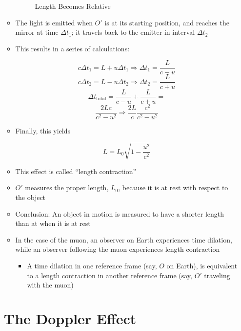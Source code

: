 \begin{itemize}
\begin{itemize}
          \begin{figure}[h]
            \centering
            
            \caption{Length Becomes Relative}
            \label{fig:3}
          \end{figure}

        \item The light is emitted when  $O'$ is at its starting position, and reaches the mirror at time $\Delta t_1$; it travels back to the emitter in interval $\Delta t_2$

        \item This results in a series of calculations:

          $$c\Delta t_1 = L + u\Delta t_1\Rightarrow \Delta t_1 = \frac{L}{c-u}$$
          $$c\Delta t_2 = L - u\Delta t_2\Rightarrow \Delta t_2 = \frac{L}{c+u}$$
          $$\Delta t_{\text{total}}=\frac{L}{c-u}+\frac{L}{c+u}=$$
          $$\frac{2Lc}{c^2-u^2}\Rightarrow\frac{2L}{c}\frac{c^2}{c^2-u^2}$$

        \item Finally, this yields

          $$L=L_0\sqrt{1-\frac{u^2}{c^2}}$$

        \item This effect is called ``length contraction''
          
        \item $O'$ measures the proper length, $L_0$, because it is at rest with respect to the object

        \item Conclusion: An object in motion is measured to have a shorter length than at when it is at rest

        \item In the case of the muon, an observer on Earth experiences time dilation, while an observer following the muon experiences length contraction

          \begin{itemize}

            \item A time dilation in one reference frame (say, $O$ on Earth), is equivalent to a length contraction in another reference frame (say, $O'$ traveling with the muon)

          \end{itemize}

    \end{itemize}

    \section{The Doppler Effect}


\end{itemize}
